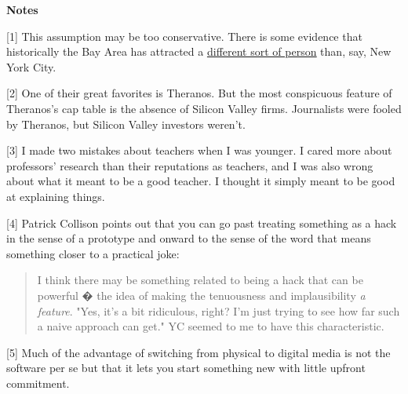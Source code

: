                   \textbf{Notes}

[1] This assumption may be too conservative. There is some
                  evidence that historically the Bay Area has attracted a
                  \href{http://www.paulgraham.com/cities.html}{\underline{different sort of person}}
                  than, say, New York City.

[2] One of their great favorites is Theranos. But the most
                  conspicuous feature of Theranos's cap table is the absence of
                  Silicon Valley firms. Journalists were fooled by Theranos, but
                  Silicon Valley investors weren't.

[3] I made two mistakes about teachers when I was younger. I
                  cared more about professors' research than their reputations
                  as teachers, and I was also wrong about what it meant to be a
                  good teacher. I thought it simply meant to be good at
                  explaining things.

[4] Patrick Collison points out that you can go past treating
                  something as a hack in the sense of a prototype and onward to
                  the sense of the word that means something closer to a
                  practical joke:
                  \begin{quote}

                    I think there may be something related to being a hack that
                    can be powerful � the idea of making the tenuousness and
                    implausibility
                    \emph{a feature}. "Yes, it's a bit ridiculous, right? I'm
                    just trying to see how far such a naive approach can get."
                    YC seemed to me to have this characteristic.
                  
\end{quote}

                  [5] Much of the advantage of switching from physical to digital
                  media is not the software per se but that it lets you start
                  something new with little upfront commitment.

